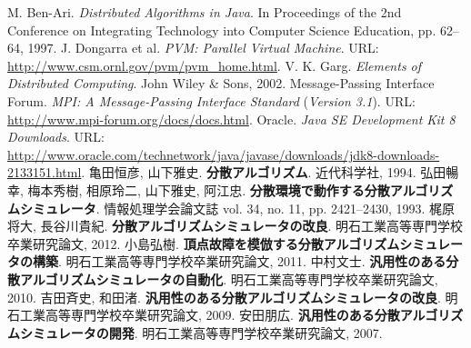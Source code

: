 \begin{thebibliography}{99}
   M. Ben-Ari. {\it Distributed Algorithms in Java}. In Proceedings of the 2nd Conference on Integrating Technology into Computer Science Education, pp. 62--64, 1997.
	 J. Dongarra et al. {\it PVM: Parallel Virtual Machine}. URL: \url{http://www.csm.ornl.gov/pvm/pvm_home.html}.
	 V. K. Garg. {\it Elements of Distributed Computing}. John Wiley \& Sons, 2002.
	 Message-Passing Interface Forum. {\it MPI: A Message-Passing Interface Standard} ({\it Version 3.1}). URL: \url{http://www.mpi-forum.org/docs/docs.html}.
	 Oracle. {\it Java SE Development Kit 8 Downloads}. URL: \url{http://www.oracle.com/technetwork/java/javase/downloads/jdk8-downloads-2133151.html}.
	 亀田恒彦, 山下雅史. {\bf 分散アルゴリズム}. 近代科学社, 1994.
	 弘田暢幸, 梅本秀樹, 相原玲二, 山下雅史, 阿江忠. {\bf 分散環境で動作する分散アルゴリズムシミュレータ}. 情報処理学会論文誌 vol. 34, no. 11, pp. 2421--2430, 1993.
	 梶原将大, 長谷川貴紀. {\bf 分散アルゴリズムシミュレータの改良}. 明石工業高等専門学校卒業研究論文, 2012.
	 小島弘樹. {\bf 頂点故障を模倣する分散アルゴリズムシミュレータの構築}. 明石工業高等専門学校卒業研究論文, 2011.
	 中村文士. {\bf 汎用性のある分散アルゴリズムシミュレータの自動化}. 明石工業高等専門学校卒業研究論文, 2010.
	 吉田斉史, 和田渚. {\bf 汎用性のある分散アルゴリズムシミュレータの改良}. 明石工業高等専門学校卒業研究論文, 2009.
	 安田朋広. {\bf 汎用性のある分散アルゴリズムシミュレータの開発}. 明石工業高等専門学校卒業研究論文, 2007.
\end{thebibliography}
